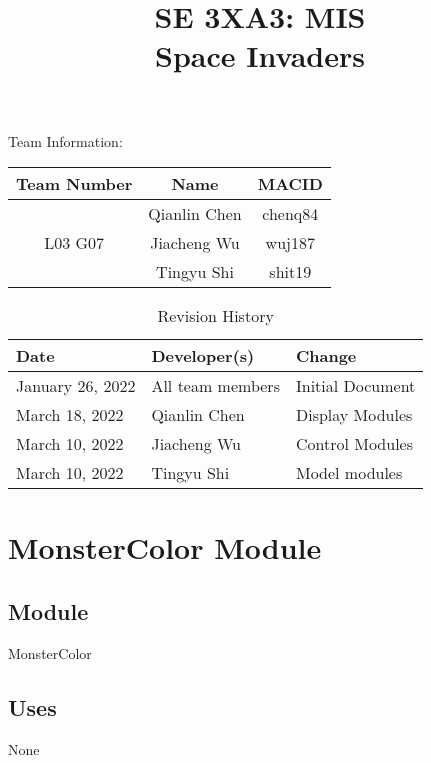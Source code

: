 \documentclass[12pt]{article}
\title{SE 3XA3: MIS\\Space Invaders}
\begin{document}
\maketitle

{\Large Team Information:}
\begin{table}[htp]
\centering
{\Large
\begin{tabular}{|c|c|c|}
\hline
\multicolumn{1}{|l|}{Team Number} & Name         & MACID   \\ \hline
\multirow{3}{*}{L03 G07}          & Qianlin Chen & chenq84 \\ \cline{2-3} 
                                  & Jiacheng Wu  & wuj187  \\ \cline{2-3} 
                                  & Tingyu Shi   & shit19  \\ \hline
\end{tabular}
}
\end{table}

\newpage
\begin{table}[htp]
\caption{Revision History} 
\begin{tabularx}{\textwidth}{llX}
\toprule
\textbf{Date} & \textbf{Developer(s)} & \textbf{Change}\\
\midrule
January 26, 2022 & All team members & Initial Document\\
March 18, 2022 & Qianlin Chen & Display Modules\\
March 10, 2022 & Jiacheng Wu & Control Modules\\
March 10, 2022 & Tingyu Shi & Model modules\\
\bottomrule
\end{tabularx}
\end{table}
\newpage
\tableofcontents
\listoftables
\listoffigures
\cleardoublepage

\section{MonsterColor Module}

\subsection*{Module}
MonsterColor

\subsection*{Uses}
None
\end{document}
